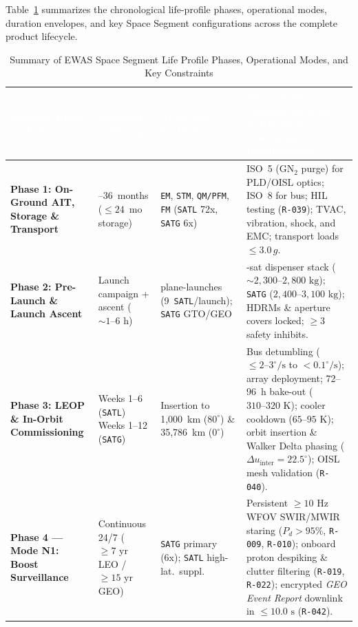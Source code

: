 \documentclass[11pt,a4paper]{article}
\newcommand{\thead}[1]{\textcolor{white}{\textbf{\textsf{#1}}}}
\providecommand{\abbr}[1]{#1}
\begin{document}
Table~\ref{tab:sseg_life_profile} summarizes the chronological life-profile phases, operational modes, duration envelopes, and key Space Segment configurations across the complete product lifecycle.

\begin{table}[H]
\centering
\caption{Summary of EWAS Space Segment Life Profile Phases, Operational Modes, and Key Constraints}
\label{tab:sseg_life_profile}
{\scriptsize\setlength{\tabcolsep}{4pt}\renewcommand{\arraystretch}{1.04}%
%
%
\noindent
\begin{tabularx}{\textwidth}{|>{\raggedright\arraybackslash}p{2.5cm}|>{\raggedright\arraybackslash}p{2.0cm}|>{\raggedright\arraybackslash}p{2.7cm}|>{\raggedright\arraybackslash}X|}
    \hline
    \rowcolor{TableHeaderBlue}
    \thead{Lifecycle Phase / Mode} & \thead{Duration / Timing} & \thead{Applicable CI \& Orbit} & \thead{Space Segment Configuration, Key Activities \& Governing Requirements} \\ \hline
    \textbf{Phase 1: On-Ground \abbr{AIT}, Storage \& Transport} & 18--36~months ($\le 24$~mo storage) & \texttt{EM}, \texttt{STM}, \texttt{QM/PFM}, \texttt{FM} (\texttt{SATL} 72x, \texttt{SATG} 6x) & ISO~5 ($\mathrm{GN_2}$ purge) for \abbr{PLD}/\abbr{OISL} optics; ISO~8 for bus; \abbr{HIL} testing (\texttt{R-039}); \abbr{TVAC}, vibration, shock, and EMC; transport loads $\le 3.0\,g$. \\ \hline
    \textbf{Phase 2: Pre-Launch \& Launch Ascent} & Launch campaign + ascent ($\sim 1\text{--}6\text{ h}$) & 8 plane-launches (9~\texttt{SATL}/launch); \texttt{SATG} \abbr{GTO}/\abbr{GEO} & 9-sat dispenser stack ($\sim 2{,}300\text{--}2{,}800\text{ kg}$); \texttt{SATG} ($2{,}400\text{--}3{,}100\text{ kg}$); \abbr{HDRM}s \& aperture covers locked; $\ge 3$ safety inhibits. \\ \hline
    \textbf{Phase 3: \abbr{LEOP} \& In-Orbit Commissioning} & Weeks 1--6 (\texttt{SATL}) \newline Weeks 1--12 (\texttt{SATG}) & Insertion to 1,000~km ($80^\circ$) \& 35,786~km ($0^\circ$) & Bus detumbling ($\le 2\text{--}3^\circ/\text{s}$ to $< 0.1^\circ/\text{s}$); array deployment; 72--96~h bake-out ($310\text{--}320\text{ K}$); cooler cooldown ($65\text{--}95\text{ K}$); orbit insertion \& Walker Delta phasing ($\Delta u_{\text{inter}} = 22.5^\circ$); \abbr{OISL} mesh validation (\texttt{R-040}). \\ \hline
    \textbf{Phase 4 --- Mode N1: Boost Surveillance} & Continuous 24/7 ($\ge 7\text{ yr}$ \abbr{LEO} / $\ge 15\text{ yr}$ \abbr{GEO}) & \texttt{SATG} primary (6x); \texttt{SATL} high-lat.\ suppl. & Persistent $\ge 10\text{ Hz}$ \abbr{WFOV} \abbr{SWIR}/\abbr{MWIR} staring ($P_d > 95\%$, \texttt{R-009}, \texttt{R-010}); onboard proton despiking \& clutter filtering (\texttt{R-019}, \texttt{R-022}); encrypted \emph{GEO Event Report} downlink in $\le 10.0\text{ s}$ (\texttt{R-042}). \\ \hline

\end{tabularx}}
\end{table}
\end{document}
